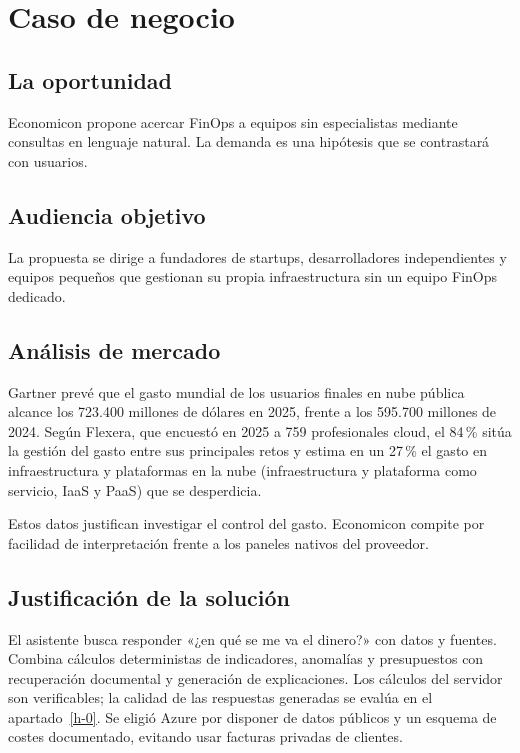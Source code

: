 \section{Caso de negocio}\label{b-0}

\subsection{La oportunidad}\label{b-2}

Economicon propone acercar FinOps a equipos sin especialistas mediante consultas en lenguaje natural. La demanda es una hipótesis que se contrastará con usuarios.

\subsection{Audiencia objetivo}\label{b-6}

La propuesta se dirige a fundadores de startups, desarrolladores independientes y equipos pequeños que gestionan su propia infraestructura sin un equipo FinOps dedicado.

\subsection{Análisis de mercado}\label{b-23}

Gartner prevé que el gasto mundial de los usuarios finales en nube pública alcance los 723.400 millones de dólares en 2025, frente a los 595.700 millones de 2024. Según Flexera, que encuestó en 2025 a 759 profesionales cloud, el 84\,\% sitúa la gestión del gasto entre sus principales retos y estima en un 27\,\% el gasto en infraestructura y plataformas en la nube (infraestructura y plataforma como servicio, IaaS y PaaS) que se desperdicia. \cite{gartner2024,flexera2025}

Estos datos justifican investigar el control del gasto. Economicon compite por facilidad de interpretación frente a los paneles nativos del proveedor.

\subsection{Justificación de la solución}\label{b-35}

El asistente busca responder «¿en qué se me va el dinero?» con datos y fuentes. Combina cálculos deterministas de indicadores, anomalías y presupuestos con recuperación documental y generación de explicaciones. Los cálculos del servidor son verificables; la calidad de las respuestas generadas se evalúa en el apartado~\ref{h-0}. Se eligió Azure por disponer de datos públicos y un esquema de costes documentado, evitando usar facturas privadas de clientes. \cite{arquitectura}

